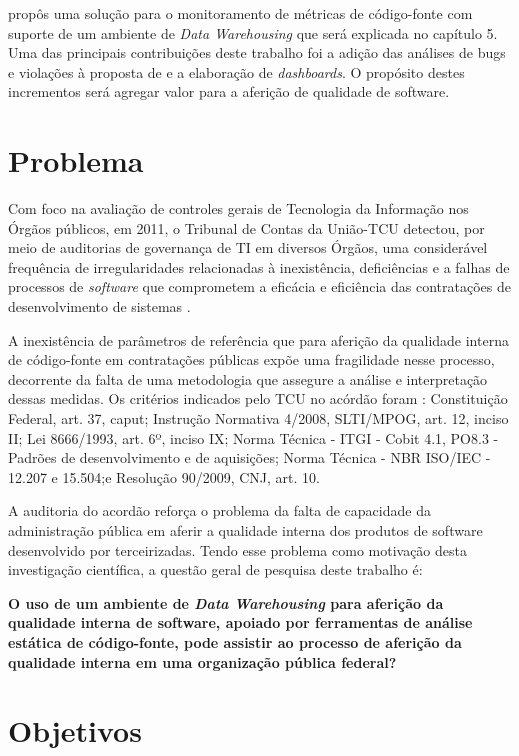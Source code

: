  propôs uma solução para o monitoramento de métricas de código-fonte com suporte de um ambiente de \textit{Data Warehousing} que será explicada no capítulo 5. Uma das principais contribuições deste trabalho foi a adição das análises de bugs e violações à proposta de  e a elaboração de \textit{dashboards}. O propósito destes incrementos será agregar valor para a aferição de qualidade de software. 


\section{Problema}
\label{problema} 

Com foco na avaliação de controles gerais de Tecnologia da Informação nos Órgãos públicos, em 2011, o Tribunal de Contas da União-TCU detectou, por meio de auditorias de governança de TI em diversos Órgãos, uma considerável frequência de irregularidades relacionadas à inexistência, deficiências e a falhas de processos de \textit{software} que comprometem a eficácia e eficiência das contratações de desenvolvimento de sistemas \cite{Acordao381_2011}. 

A inexistência de parâmetros de referência que para aferição da qualidade interna de código-fonte em contratações públicas expõe uma fragilidade nesse processo, decorrente da falta de uma metodologia que assegure a análise e interpretação dessas medidas. Os critérios indicados pelo TCU no acórdão \cite{Acordao381_2011} foram : Constituição Federal, art. 37, caput; Instrução Normativa 4/2008, SLTI/MPOG, art. 12, inciso II; Lei 8666/1993, art. 6º, inciso IX; Norma Técnica - ITGI - Cobit 4.1, PO8.3 - Padrões de desenvolvimento e de aquisições; Norma Técnica - NBR ISO/IEC - 12.207 e 15.504;e Resolução 90/2009, CNJ, art. 10. 

A auditoria do acordão \cite{Acordao381_2011} reforça o problema da falta de capacidade da administração pública em aferir a qualidade interna dos produtos de software desenvolvido por terceirizadas. Tendo esse problema  como motivação desta investigação científica, a questão geral de pesquisa deste trabalho é:

\textbf{O uso de um ambiente de \textit{Data Warehousing} para aferição da qualidade interna de software, apoiado por ferramentas de análise estática de código-fonte,  pode assistir ao processo de aferição da qualidade interna em uma organização pública federal?}


\section{Objetivos}

